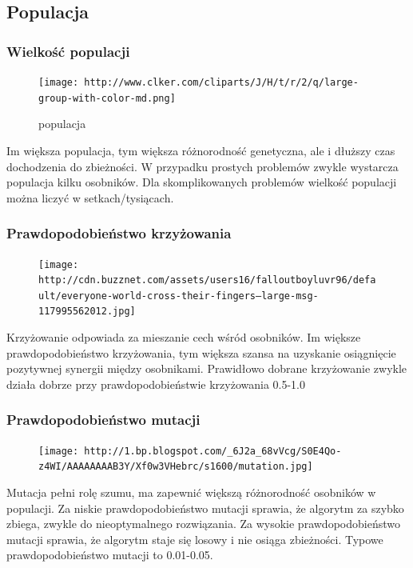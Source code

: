 \documentclass{article}
\begin{document}
    \subsection{Populacja}

    \subsubsection{Wielkość populacji}

\begin{figure}[htbp]
\centering
\texttt{[image: http://www.clker.com/cliparts/J/H/t/r/2/q/large-group-with-color-md.png]}
\caption{populacja}
\end{figure}

    Im większa populacja, tym większa różnorodność genetyczna, ale i dłuższy
czas dochodzenia do zbieżności. W przypadku prostych problemów zwykle
wystarcza populacja kilku osobników. Dla skomplikowanych problemów
wielkość populacji można liczyć w setkach/tysiącach.

    \subsubsection{Prawdopodobieństwo krzyżowania}

\begin{figure}[htbp]
\centering
\texttt{[image: http://cdn.buzznet.com/assets/users16/falloutboyluvr96/default/everyone-world-cross-their-fingers--large-msg-117995562012.jpg]}
\caption{}
\end{figure}

    Krzyżowanie odpowiada za mieszanie cech wśród osobników. Im większe
prawdopodobieństwo krzyżowania, tym większa szansa na uzyskanie
osiągnięcie pozytywnej synergii między osobnikami. Prawidłowo dobrane
krzyżowanie zwykle działa dobrze przy prawdopodobieństwie krzyżowania
0.5-1.0

    \subsubsection{Prawdopodobieństwo mutacji}

\begin{figure}[htbp]
\centering
\texttt{[image: http://1.bp.blogspot.com/\_6J2a\_68vVcg/S0E4Qo-z4WI/AAAAAAAAB3Y/Xf0w3VHebrc/s1600/mutation.jpg]}
\caption{}
\end{figure}

    Mutacja pełni rolę szumu, ma zapewnić większą różnorodność osobników w
populacji. Za niskie prawdopodobieństwo mutacji sprawia, że algorytm za
szybko zbiega, zwykle do nieoptymalnego rozwiązania. Za wysokie
prawdopodobieństwo mutacji sprawia, że algorytm staje się losowy i nie
osiąga zbieżności. Typowe prawdopodobieństwo mutacji to 0.01-0.05.
\end{document}
